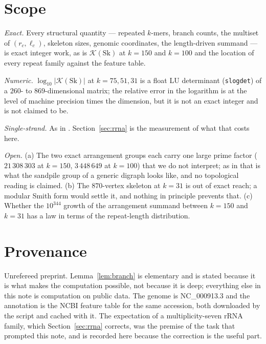 \documentclass[11pt]{article}
\theoremstyle{plain}
\theoremstyle{definition}
\theoremstyle{remark}
\newcommand{\K}{\mathcal{K}}
\newcommand{\Sk}{\mathrm{Sk}}
\begin{document}
\section{Scope}\label{sec:scope}

\emph{Exact.} Every structural quantity --- repeated $k$-mers, branch counts, the multiset
of $(r_c,\ell_c)$, skeleton sizes, genomic coordinates, the length-driven summand --- is
exact integer work, as is $\K(\Sk)$ at $k=150$ and $k=100$ and the location of every repeat
family against the feature table.

\emph{Numeric.} $\log_{10}|\K(\Sk)|$ at $k=75,51,31$ is a float LU determinant
(\texttt{slogdet}) of a $260$- to $869$-dimensional matrix; the relative error in the
logarithm is at the level of machine precision times the dimension, but it is not an
exact integer and is not claimed to be.

\emph{Single-strand.} As in \cite{Bio1,Bio2,Bio3,Bio4}. Section~\ref{sec:rrna} is the
measurement of what that costs here.

\emph{Open.} (a) The two exact arrangement groups each carry one large prime factor
($21\,308\,303$ at $k=150$, $3\,448\,649$ at $k=100$) that we do not interpret; as in
\cite{Bio3} that is what the sandpile group of a generic digraph looks like, and no
topological reading is claimed. (b) The $870$-vertex skeleton at $k=31$ is out of exact
reach; a modular Smith form would settle it, and nothing in principle prevents that.
(c) Whether the $10^{344}$ growth of the arrangement summand between $k=150$ and $k=31$
has a law in terms of the repeat-length distribution.

\section*{Provenance}

Unrefereed preprint. Lemma~\ref{lem:branch} is elementary and is stated because it is
what makes the computation possible, not because it is deep; everything else in this note
is computation on public data. The genome is NC\_000913.3 and the annotation is the NCBI
feature table for the same accession, both downloaded by the script and cached with it.
The expectation of a multiplicity-seven rRNA family, which Section~\ref{sec:rrna}
corrects, was the premise of the task that prompted this note, and is recorded here
because the correction is the useful part.
\end{document}
